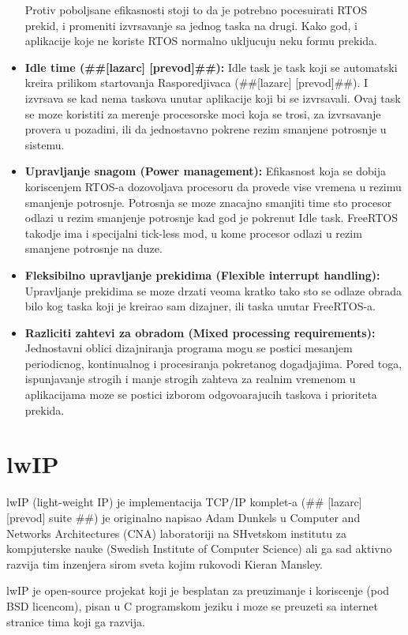 \documentclass[a4paper,12pt, master]{etf}
\begin{document}
\begin{itemize}
		Protiv poboljsane efikasnosti stoji to da je potrebno pocesuirati RTOS prekid, i 
		promeniti izvrsavanje sa jednog taska na drugi. Kako god, i aplikacije koje ne koriste 
		RTOS normalno ukljucuju neku formu prekida.
		\item \textbf{Idle time (\#\#[lazarc] [prevod]\#\#):}
		Idle task je task koji se automatski kreira prilikom startovanja Rasporedjivaca
		(\#\#[lazarc] [prevod]\#\#). I izvrsava se kad nema taskova unutar aplikacije koji bi 
		se izvrsavali. Ovaj task se moze koristiti za merenje procesorske moci koja se trosi, 
		za izvrsavanje provera u pozadini, ili da jednostavno pokrene rezim smanjene potrosnje 
		u sistemu.
		\item \textbf{Upravljanje snagom (Power management):}
		Efikasnost koja se dobija koriscenjem RTOS-a dozovoljava procesoru da provede vise 
		vremena	u rezimu smanjenje potrosnje. Potrosnja se moze znacajno smanjiti time sto 
		procesor odlazi u rezim smanjenje potrosnje kad god je pokrenut Idle task. FreeRTOS 
		takodje ima i specijalni tick-less mod, u kome procesor odlazi u rezim smanjene 
		potrosnje na duze.
		\item \textbf{Fleksibilno upravljanje prekidima (Flexible interrupt handling):}
		Upravljanje prekidima se moze drzati veoma kratko tako sto se odlaze obrada bilo kog 
		taska koji je kreirao sam dizajner, ili taska unutar FreeRTOS-a.
		\item \textbf{Razliciti zahtevi za obradom (Mixed processing requirements):}
		Jednostavni oblici dizajniranja programa mogu se postici mesanjem periodicnog, 
		kontinualnog i procesiranja pokretanog dogadjajima. Pored toga, ispunjavanje strogih i 
		manje strogih zahteva za realnim vremenom u aplikacijama moze se postici izborom 
		odgovoarajucih taskova i prioriteta prekida.

	\end{itemize}

	\section{lwIP}

	lwIP (light-weight IP) je implementacija TCP/IP komplet-a (\#\# [lazarc] [prevod] suite 
	\#\#) je originalno napisao Adam Dunkels u Computer and Networks Architectures (CNA) 
	laboratoriji na	SHvetskom institutu za kompjuterske nauke (Swedish Institute of Computer 
	Science) ali ga sad	aktivno razvija tim inzenjera sirom sveta kojim rukovodi Kieran 
	Mansley.

	lwIP je open-source projekat koji je besplatan za preuzimanje i koriscenje (pod BSD 
	licencom), pisan u C programskom jeziku i moze se preuzeti sa internet stranice tima koji 
	ga razvija.
\end{document}
